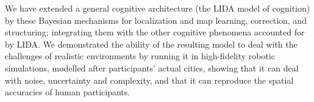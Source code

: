 {%

We have extended a general cognitive architecture (the LIDA model of cognition) by these Bayesian mechanisms for localization and map learning, correction, and structuring; integrating them with the other cognitive phenomena accounted for by LIDA. We demonstrated the ability of the resulting model to deal with the challenges of realistic environments by running it in high-fidelity robotic simulations, modelled after participants' actual cities, showing that it can deal with noise, uncertainty and complexity, and that it can reproduce the spatial accuracies of human participants. 

}

